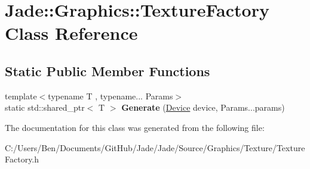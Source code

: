 \hypertarget{class_jade_1_1_graphics_1_1_texture_factory}{}\section{Jade\+:\+:Graphics\+:\+:Texture\+Factory Class Reference}
\label{class_jade_1_1_graphics_1_1_texture_factory}
\subsection*{Static Public Member Functions}
\begin{DoxyCompactItemize}
\item 
\hypertarget{class_jade_1_1_graphics_1_1_texture_factory_a378568ba62fa85bb98fd76d625f1fd0b}{}{\footnotesize template$<$typename T , typename... Params$>$ }\\static std\+::shared\+\_\+ptr$<$ T $>$ {\bfseries Generate} (\hyperlink{class_jade_1_1_graphics_1_1_device}{Device} device, Params...\+params)\label{class_jade_1_1_graphics_1_1_texture_factory_a378568ba62fa85bb98fd76d625f1fd0b}

\end{DoxyCompactItemize}


The documentation for this class was generated from the following file\+:\begin{DoxyCompactItemize}
\item 
C\+:/\+Users/\+Ben/\+Documents/\+Git\+Hub/\+Jade/\+Jade/\+Source/\+Graphics/\+Texture/Texture\+Factory.\+h\end{DoxyCompactItemize}
